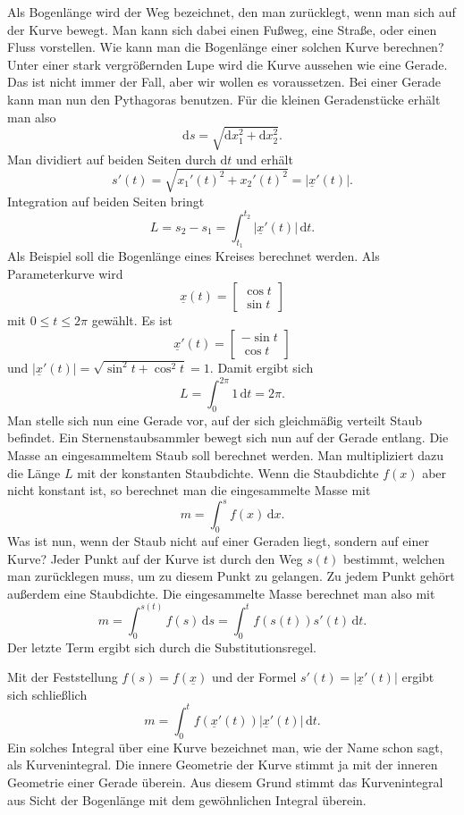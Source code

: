 \documentclass[a4paper,10pt,fleqn,twocolumn,twoside]{article}
\begin{document}
Als Bogenlänge wird der Weg bezeichnet, den man zurücklegt, wenn
man sich auf der Kurve bewegt. Man kann sich dabei einen Fußweg,
eine Straße, oder einen Fluss vorstellen. Wie kann man die
Bogenlänge einer solchen Kurve berechnen?
Unter einer stark vergrößernden Lupe wird die Kurve aussehen wie
eine Gerade. Das ist nicht immer der Fall, aber wir wollen es
voraussetzen. Bei einer Gerade kann man nun den Pythagoras benutzen.
Für die kleinen Geradenstücke erhält man also
\[\mathrm ds = \sqrt{\mathrm dx_1^2+\mathrm dx_2^2}.\]
Man dividiert auf beiden Seiten durch $\mathrm dt$ und erhält
\[s'(t) = \sqrt{x_1'(t)^2+x_2'(t)^2} = |\underline x'(t)|.\]
Integration auf beiden Seiten bringt
\[L = s_2-s_1 = \int_{t_1}^{t_2} |\underline x'(t)|\,\mathrm dt.\]
%
Als Beispiel soll die Bogenlänge eines Kreises berechnet werden.
Als Parameterkurve wird
\[\underline x(t) = \begin{bmatrix}\cos t\\ \sin t\end{bmatrix}\]
mit $0\le t\le 2\pi$ gewählt. Es ist
\[\underline x'(t) = \begin{bmatrix}-\sin t\\ \cos t\end{bmatrix}\]
und $|\underline x'(t)|=\sqrt{\sin^2 t+\cos^2 t}=1$.
Damit ergibt sich
\[L = \int_0^{2\pi} 1\,\mathrm dt=2\pi.\]
%
Man stelle sich nun eine Gerade vor, auf der sich gleichmäßig
verteilt Staub befindet. Ein Sternenstaubsammler bewegt sich nun auf
der Gerade entlang. Die Masse an eingesammeltem Staub soll
berechnet werden. Man multipliziert dazu die Länge $L$ mit der
konstanten Staubdichte. Wenn die Staubdichte $f(x)$ aber nicht
konstant ist, so berechnet man die eingesammelte Masse mit
\[m = \int_0^s f(x)\,\mathrm dx.\]
%
Was ist nun, wenn der Staub nicht auf einer Geraden liegt, sondern auf
einer Kurve? Jeder Punkt auf der Kurve ist durch den Weg $s(t)$
bestimmt, welchen man zurücklegen muss, um zu diesem Punkt zu
gelangen. Zu jedem Punkt gehört außerdem eine Staubdichte. Die
eingesammelte Masse berechnet man also mit
\[m = \int_0^{s(t)} f(s)\,\mathrm ds
= \int_0^t f(s(t))s'(t)\,\mathrm dt.\]
Der letzte Term ergibt sich durch die Substitutionsregel.

Mit der Feststellung $f(s) = f(\underline x)$ und der Formel
$s'(t) = |\underline x'(t)|$ ergibt sich schließlich
\[m = \int_0^t f(\underline x'(t))|\underline x'(t)|\,\mathrm dt.\]
Ein solches Integral über eine Kurve bezeichnet man, wie der Name
schon sagt, als Kurvenintegral. Die innere Geometrie der Kurve stimmt
ja mit der inneren Geometrie einer Gerade überein. Aus diesem Grund
stimmt das Kurvenintegral aus Sicht der Bogenlänge mit dem
gewöhnlichen Integral überein.
\end{document}
